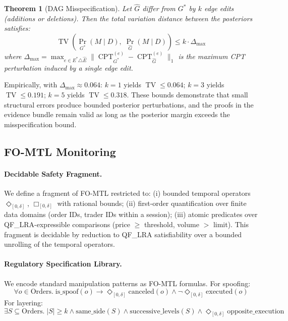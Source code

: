 \documentclass[11pt]{article}
\newtheorem{theorem}{Theorem}
\DeclareMathOperator{\TV}{TV}
\DeclareMathOperator{\Pr}{Pr}
\DeclareMathOperator{\CPT}{CPT}
\begin{document}
\begin{theorem}[DAG Misspecification]
\label{thm:misspec}
Let $\hat{G}$ differ from $G^*$ by $k$ edge edits (additions or deletions).
Then the total variation distance between the posteriors satisfies:
\[
  \TV\!\left(\Pr_{G^*}(M \mid D),\; \Pr_{\hat{G}}(M \mid D)\right) \leq k \cdot \Delta_{\max}
\]
where $\Delta_{\max} = \max_{e \in E^* \triangle \hat{E}} \|\CPT_{G^*}^{(e)} - \CPT_{\hat{G}}^{(e)}\|_1$ is the maximum CPT perturbation induced by a single edge edit.
\end{theorem}

Empirically, with $\Delta_{\max} \approx 0.064$:
$k=1$ yields $\TV \leq 0.064$;
$k=3$ yields $\TV \leq 0.191$;
$k=5$ yields $\TV \leq 0.318$.
These bounds demonstrate that small structural errors produce bounded posterior perturbations, and the proofs in the evidence bundle remain valid as long as the posterior margin exceeds the misspecification bound.

\subsection{FO-MTL Monitoring}
\label{sec:fotl}

\paragraph{Decidable Safety Fragment.}
We define a fragment of FO-MTL restricted to:
(i) bounded temporal operators $\Diamond_{[0,\delta]}$, $\Box_{[0,\delta]}$ with rational bounds;
(ii) first-order quantification over finite data domains (order IDs, trader IDs within a session);
(iii) atomic predicates over QF\_LRA-expressible comparisons (price $\geq$ threshold, volume $>$ limit).
This fragment is decidable by reduction to QF\_LRA satisfiability over a bounded unrolling of the temporal operators.

\paragraph{Regulatory Specification Library.}
We encode standard manipulation patterns as FO-MTL formulas.
For spoofing:
\[
  \forall o \in \text{Orders}.\; \text{is\_spoof}(o) \to \Diamond_{[0,\delta]}\text{canceled}(o) \land \neg\Diamond_{[0,\delta]}\text{executed}(o)
\]
For layering:
\[
  \exists S \subseteq \text{Orders}.\; |S| \geq k \land \text{same\_side}(S) \land \text{successive\_levels}(S) \land \Diamond_{[0,\delta]}\text{opposite\_execution}
\]
\end{document}
